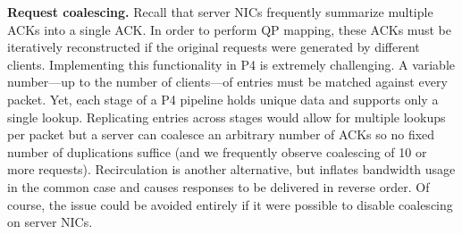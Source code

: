 

\textbf{Request coalescing.} Recall that server NICs frequently
summarize multiple ACKs into a single ACK.  In order to perform QP
mapping, these ACKs must be iteratively reconstructed if the
original requests were generated by different clients.
Implementing this functionality in P4 is extremely challenging. A
variable number---up to the number of clients---of entries must be
matched against every packet.  Yet, each stage of a P4 pipeline holds
unique data and supports only a single lookup.
Replicating entries across stages would allow for multiple lookups
per packet but a server can coalesce
an arbitrary number of ACKs so no fixed number of duplications suffice
(and we frequently observe coalescing of 10 or more requests).
Recirculation is another alternative, but inflates bandwidth usage in
the common case and causes responses to be delivered in reverse order.
Of course, the issue could be avoided entirely if it were possible
to disable coalescing on server NICs.



